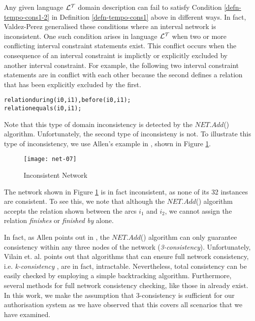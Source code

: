 \documentclass[11pt]{report}
\newenvironment{vverbatim}
{
  \begin{alltt}
}
{
    \vspace{-\baselineskip}
  \end{alltt}
}
\begin{document}
      Any given language ${\cal L^T}$ domain description can fail to satisfy
      Condition \ref{defn-tempo-cons1-2} in Definition \ref{defn-tempo-cons1}
      above in different ways. In fact, Valdez-Perez \cite{VAL} generalised
      these conditions where an interval network is inconsistent\footnotemark.
      One such condition arises in language ${\cal L^T}$ when two or more
      conflicting interval constraint statements exist. This conflict occurs
      when the consequence of an interval constraint is implictly or explicitly
      excluded by another interval constraint. For example, the following two
      interval constraint statements are in conflict with each other because
      the second defines a relation that has been explicitly excluded by the
      first.

      \begin{vverbatim}
  relation during(i0, i1), before(i0, i1);
  relation equals(i0, i1);
      \end{vverbatim}

      Note that this type of domain inconsistency is detected by the
      $NET.Add$() algorithm. Unfortunately, the second type of inconsisteny is
      not. To illustrate this type of inconsistency, we use Allen's example in
      \cite{ALE}, shown in Figure \ref{figu-tempo-ntwk7}.

      \begin{figure}[tbhp]
        \begin{center}
          \texttt{[image: net-07]}
          \caption{Inconsistent Network}
          \label{figu-tempo-ntwk7}
        \end{center}
      \end{figure}

      The network shown in Figure \ref{figu-tempo-ntwk7} is in fact
      inconsistent, as none of its 32 instances are consistent. To see this, we
      note that although the $NET.Add$() algorithm accepts the relation shown
      between the arcs $i_1$ and $i_2$, we cannot assign the relation
      {\em finishes} or {\em finished by} alone.

      In fact, as Allen points out in \cite{ALE}, the $NET.Add$() algorithm can
      only guarantee consistency within any three nodes of the network
      ({\em 3-consistency}). Unfortunately, Vilain et. al. \cite{VIL} points out
      that algorithms that can ensure full network consistency, i.e.
      {\em k-consistency} \cite{FRE}, are in fact, intractable. Nevertheless,
      total consistency can be easily checked by employing a simple
      backtracking algorithm. Furthermore, several methods for full network
      consistency checking, like those in \cite{LAD,VAN} already exist. In this
      work, we make the assumption that 3-consistency is sufficient for our
      authorisation system as we have observed that this covers all scenarios
      that we have examined.
\end{document}
